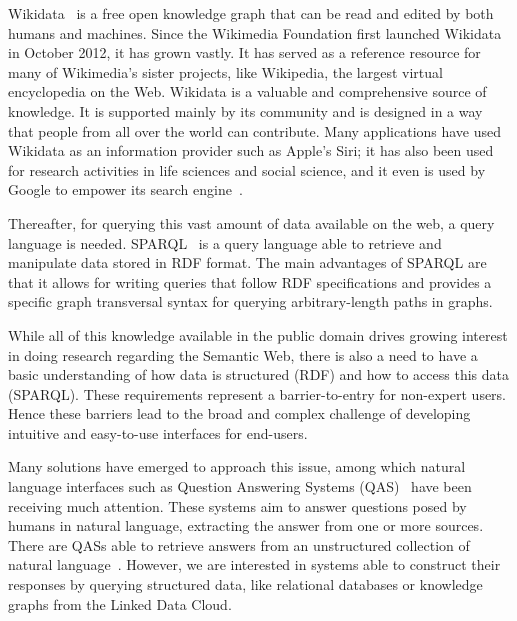 Wikidata~\cite{KG:wikidata} is a free open knowledge graph that can be read and edited by both humans 
and machines. Since the Wikimedia Foundation first launched Wikidata in October 2012, 
it has grown vastly. It has served as a reference resource for many of Wikimedia’s sister 
projects, like Wikipedia, the largest virtual encyclopedia on the Web. Wikidata is a valuable 
and comprehensive source of knowledge. It is supported mainly by its community and is 
designed in a way that people from all over the world can contribute. Many applications have 
used Wikidata as an information provider such as Apple’s Siri; it has also been used for research activities in life 
sciences and social science, and it even is used by Google to empower its search engine~\cite{wikidata:usage-MalyshevKGGB18}.

Thereafter, for querying this vast amount of data available on the web, a query language is 
needed. SPARQL~\cite{key:sparql11} is a query language able to retrieve and manipulate data stored in RDF 
format. The main advantages of SPARQL are that it allows for writing queries that follow RDF 
specifications and provides a specific graph transversal syntax for querying arbitrary-length 
paths in graphs.

While all of this knowledge available in the public domain drives growing interest in doing 
research regarding the Semantic Web, there is also a need to have a basic understanding of 
how data is structured (RDF) and how to access this data (SPARQL). These requirements 
represent a barrier-to-entry for non-expert users. Hence these barriers lead to the broad and 
complex challenge of developing intuitive and easy-to-use interfaces for end-users.

Many solutions have emerged to approach this issue, among which natural language interfaces 
such as Question Answering Systems (QAS)~\cite{qa:survey-BOUZIANE2015366, qa:intro-UngerFC14, qa:nn-qakg-Chakraborty19} 
have been receiving much attention. 
These systems aim to answer questions posed by humans in natural language, extracting the 
answer from one or more sources. There are QASs able to retrieve answers from an unstructured 
collection of natural language~\cite{qa:survey-BOUZIANE2015366}. However, we are interested in systems able to 
construct their responses by querying structured data, like relational databases or knowledge 
graphs from the Linked Data Cloud.

